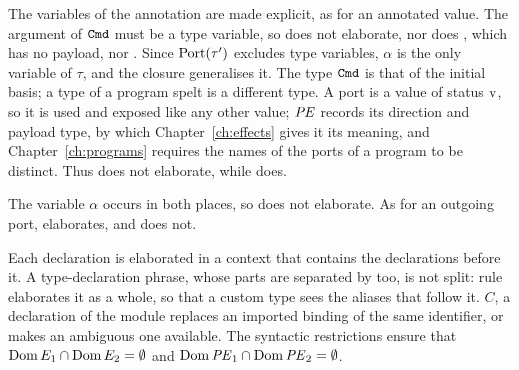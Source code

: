 \begin{rulecomments}
 The variables of the annotation are made
explicit, as for an annotated value. The argument of $\mathtt{Cmd}$ must be a type
variable, so  does not elaborate, nor does
, which has no payload, nor . Since $\mathrm{Port}(\tau')$ excludes type variables, $\alpha$ is the only
variable of $\tau$, and the closure generalises it. The type $\mathtt{Cmd}$ is that
of the initial basis; a type of a program spelt  is a different type.
A port is a value of status $\mathrm{v}$, so it is used and exposed like any other
value; $\mathit{PE}$ records its direction and payload type, by which
Chapter~\ref{ch:effects} gives it its meaning, and Chapter~\ref{ch:programs}
requires the names of the ports of a program to be distinct. %
Thus  does not elaborate, while  does. %

 The variable $\alpha$ occurs in both places, so
 does not elaborate. As for an outgoing
port,  elaborates, and
 does not.

 Each declaration is elaborated in a context that
contains the declarations before it. A type-declaration phrase, whose parts are
separated by \kw{;} too, is not split: rule~ elaborates
it as a whole, so that a custom type sees the aliases that follow it. %
$C$, a declaration of the module replaces an imported binding of the same
identifier, or makes an ambiguous one available. The syntactic restrictions
ensure that $\mathrm{Dom}\, E_1 \cap \mathrm{Dom}\, E_2 = \emptyset$ and $\mathrm{Dom}\,\mathit{PE}_1 \cap \mathrm{Dom}\,\mathit{PE}_2
= \emptyset$.
\end{rulecomments}



